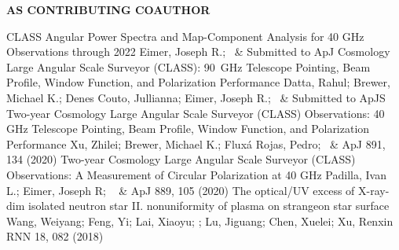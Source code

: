 \begin{footnotesize}
\textsf{\textbf{AS CONTRIBUTING COAUTHOR}}
\end{footnotesize}
\begin{etaremune}[topsep=0pt,itemsep=0pt,partopsep=0pt,parsep=0pt]
\renewcommand\labelenumi{\footnotesize\bfseries\theenumi.}
        {CLASS Angular Power Spectra and Map-Component Analysis for 40 GHz Observations through 2022}
        {Eimer, Joseph R.; \bfyl~\& \class}
        {Submitted to ApJ}
        {Cosmology Large Angular Scale Surveyor (CLASS): 90~GHz Telescope Pointing, Beam Profile, Window Function, and Polarization Performance}
        {Datta, Rahul; Brewer, Michael K.; Denes Couto, Jullianna; Eimer, Joseph R.; \bfyl~\& \class}
        {Submitted to ApJS}
        {Two-year Cosmology Large Angular Scale Surveyor (CLASS) Observations: 40 GHz Telescope Pointing, Beam Profile, Window Function, and Polarization Performance}
        {Xu, Zhilei; Brewer, Michael K.; Fluxá Rojas, Pedro; \bfyl~\& \class}
        {ApJ 891, 134 (2020)}
        {Two-year Cosmology Large Angular Scale Surveyor (CLASS) Observations: A Measurement of Circular Polarization at 40 GHz}
        {Padilla, Ivan L.; Eimer, Joseph R; \bfyl~ \& \class}
        {ApJ 889, 105 (2020)}
        {The optical/UV excess of X-ray-dim isolated neutron star II. nonuniformity of plasma on strangeon star surface}
        {Wang, Weiyang; Feng, Yi; Lai, Xiaoyu; \bfyl; Lu, Jiguang; Chen, Xuelei; Xu, Renxin}
        {RNN 18, 082 (2018)}
\end{etaremune}

